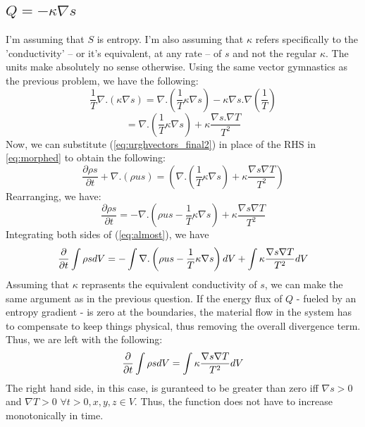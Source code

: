 \documentclass[english]{article}
\begin{document}
\subsection{$Q = -\kappa \nabla s$}
I'm assuming that $S$ is entropy. I'm also assuming that $\kappa$ refers
specifically to the 'conductivity' -- or it's equivalent, at any rate -- 
of $s$ and not the regular $\kappa$. The units make absolutely no sense 
otherwise. Using the same vector gymnastics as the previous problem, we 
have the following:
$$
	\frac{1}{T}\nabla.(\kappa\nabla s) = 
	\nabla . (\frac{1}{T}\kappa \nabla s) -
	\kappa \nabla s.\nabla\left(\frac{1}{T}\right)
$$
\begin{equation}
	= \nabla . (\frac{1}{T}\kappa \nabla s) + 
	\kappa \frac{\nabla s.\nabla T}{T^{2}}
	\label{eq:urghvectors_final2}
\end{equation}
Now, we can substitute (\ref{eq:urghvectors_final2}) in place of the RHS in
\ref{eq:morphed} to obtain the following:
$$
	\frac{\partial \rho s}{\partial t}+\nabla.(\rho us)=\left(
	\nabla . (\frac{1}{T}\kappa \nabla s) + 
	\kappa \frac{\nabla s\nabla T}{T^{2}}
	\right)
$$
Rearranging, we have:
\begin{equation}
	\frac{\partial \rho s}{\partial t}=
	-\nabla.\left(\rho us - \frac{1}{T}\kappa \nabla s \right) 
	+\kappa \frac{\nabla s\nabla T}{T^{2}}
	\label{eq:almost}
\end{equation}
Integrating both sides of (\ref{eq:almost}), we have
$$
	\frac{\partial}{\partial t} \intop \rho sdV=
	-\intop \nabla.\left(\rho us - \frac{1}{T}\kappa \nabla s \right) dV
	+\intop\kappa \frac{\nabla s \nabla T}{T^{2}}dV
$$
Assuming that $\kappa$ reprasents the equivalent conductivity of $s$, we
can make the same argument as in the previous question. 
If the energy flux of $Q$ - fueled by an entropy gradient - is zero at the 
boundaries, the material flow in the system has to compensate to keep things
physical, thus removing the overall divergence term.
Thus, we are left with the following:
\begin{equation}
	\frac{\partial}{\partial t} \intop \rho sdV=
	\intop\kappa \frac{\nabla s \nabla T}{T^{2}}dV
	\label{eq:done}
\end{equation}
The right hand side, in this case, is guranteed to be greater than zero 
iff $\nabla s >0$ and $\nabla T > 0$ $\forall t>0, {x,y,z}\in V$. Thus,
the function does not have to increase monotonically in time.
\end{document}
